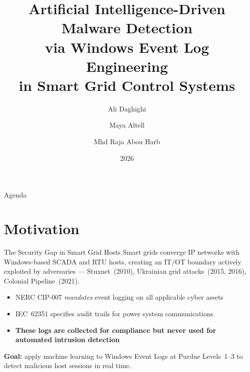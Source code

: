 \documentclass[aspectratio=169]{beamer}
\title{Artificial Intelligence-Driven Malware Detection\\
via Windows Event Log Engineering\\
in Smart Grid Control Systems}
\author{Ali Daghighi \and Maya Altell \and Mhd Raja Abou Harb}
\institute{Department of Computer Engineering, Biruni University, Istanbul, Turkey}
\date{2026}
\begin{document}
\begin{frame}
  \titlepage
\end{frame}

\begin{frame}{Agenda}
  \tableofcontents[hideallsubsections]
\end{frame}

\section{Motivation}

\begin{frame}{The Security Gap in Smart Grid Hosts}
  Smart grids converge IP networks with Windows-based SCADA and RTU hosts,
  creating an IT/OT boundary actively exploited by adversaries --- Stuxnet~(2010),
  Ukrainian grid attacks~(2015, 2016), Colonial Pipeline~(2021).

  \vspace{0.7em}
  \begin{itemize}
    \item NERC CIP-007 \emph{mandates} event logging on all applicable cyber assets
    \item IEC~62351 specifies audit trails for power system communications
    \pause
    \item \textbf{These logs are collected for compliance but never used for automated
          intrusion detection}
  \end{itemize}

  \vspace{0.7em}
  \pause
  \textbf{Goal:} apply machine learning to Windows Event Logs at Purdue
  Levels~1--3 to detect malicious host sessions in real time.
\end{frame}
\end{document}
